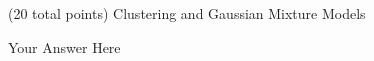 \documentclass[12pt]{article}
\begin{document}
\begin{question}{(20 total points) Clustering and Gaussian Mixture Models}
\begin{subquestion}
      \begin{answerbox}{30em}
         Your Answer Here
      \end{answerbox}
  


   \end{subquestion}

   
\end{question}
\end{document}
